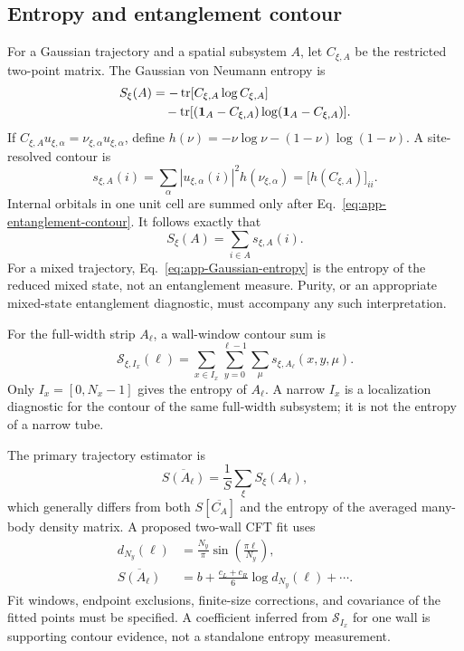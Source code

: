 \subsection{Entropy and entanglement contour}

For a Gaussian trajectory and a spatial subsystem \(A\), let
\(C_{\xi,A}\) be the restricted two-point matrix.  The Gaussian von Neumann
entropy is
\begin{align}
    S_\xi(A)
    &=-\operatorname{tr}[C_{\xi,A}\log C_{\xi,A}]\nonumber\\
    &\quad-\operatorname{tr}[(\mathbf{1}_A-C_{\xi,A})
      \log(\mathbf{1}_A-C_{\xi,A})].
    \label{eq:app-Gaussian-entropy}
\end{align}
If
\(C_{\xi,A}u_{\xi,\alpha}=\nu_{\xi,\alpha}u_{\xi,\alpha}\), define
\(h(\nu)=-\nu\log\nu-(1-\nu)\log(1-\nu)\).  A site-resolved contour is
\begin{equation}
    s_{\xi,A}(i)
    =\sum_\alpha |u_{\xi,\alpha}(i)|^2h(\nu_{\xi,\alpha})
    =\bigl[h(C_{\xi,A})\bigr]_{ii}.
    \label{eq:app-entanglement-contour}
\end{equation}
Internal orbitals in one unit cell are summed only after
Eq.~\eqref{eq:app-entanglement-contour}.  It follows exactly that
\begin{equation}
    S_\xi(A)=\sum_{i\in A}s_{\xi,A}(i).
\end{equation}
For a mixed trajectory, Eq.~\eqref{eq:app-Gaussian-entropy} is the entropy of
the reduced mixed state, not an entanglement measure.  Purity, or an
appropriate mixed-state entanglement diagnostic, must accompany any such
interpretation.

For the full-width strip \(A_\ell\), a wall-window contour sum is
\begin{equation}
    \mathcal S_{\xi,I_x}(\ell)
    =\sum_{x\in I_x}\sum_{y=0}^{\ell-1}
      \sum_\mu s_{\xi,A_\ell}(x,y,\mu).
    \label{eq:app-windowed-contour}
\end{equation}
Only \(I_x=[0,N_x-1]\) gives the entropy of \(A_\ell\).  A narrow \(I_x\)
is a localization diagnostic for the contour of the same full-width
subsystem; it is not the entropy of a narrow tube.

The primary trajectory estimator is
\begin{equation}
    \overline{S(A_\ell)}
    =\frac1S\sum_\xi S_\xi(A_\ell),
    \label{eq:app-average-trajectory-entropy}
\end{equation}
which generally differs from both \(S[\overline{C_A}]\) and the entropy of
the averaged many-body density matrix.  A proposed two-wall CFT fit uses
\begin{align}
    d_{N_y}(\ell)
    &=\frac{N_y}{\pi}
      \sin\!\left(\frac{\pi\ell}{N_y}\right),\nonumber
    \\
    \overline{S(A_\ell)}
    &=b+\frac{c_L+c_R}{6}\log d_{N_y}(\ell)+\cdots .
    \label{eq:app-entropy-log-chord-fit}
\end{align}
Fit windows, endpoint exclusions, finite-size corrections, and covariance of
the fitted points must be specified.  A coefficient inferred from
\(\mathcal S_{I_x}\) for one wall is supporting contour evidence, not a
standalone entropy measurement.

